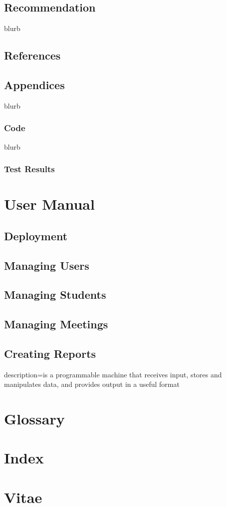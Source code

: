 \documentclass{journal}
\begin{document}
\subsection{Recommendation}
blurb 

\newpage
\subsection{References}



\newpage 

\subsection{Appendices}
blurb
\subsubsection{Code}
blurb 
\subsubsection{Test Results}

 
\section{User Manual}

\subsection{Deployment}

\subsection{Managing Users}

\subsection{Managing Students}

\subsection{Managing Meetings}

\subsection{Creating Reports}



{
  description={is a programmable machine that receives input,
               stores and manipulates data, and provides
               output in a useful format}
}
\newpage 
\section{Glossary}
\printglossaries
\section{Index}
\section{Vitae}
\end{document}
